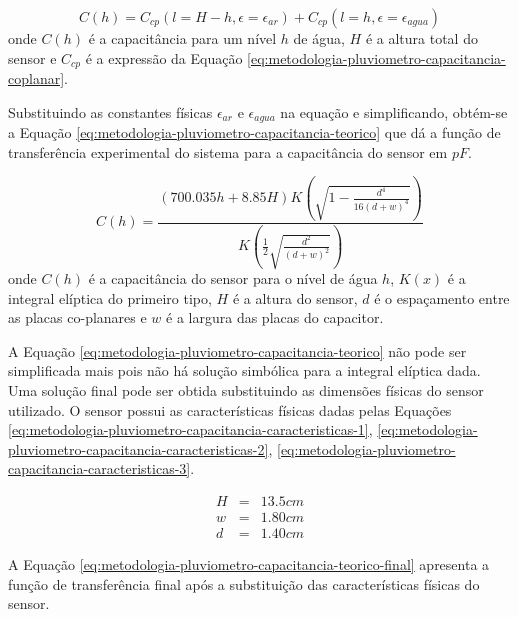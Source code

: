 \documentclass[a4paper]{instrumentacao}
\begin{document}
\begin{equation}
	C(h) = C_{cp}\left(l=H-h, \epsilon=\epsilon_{ar}\right) + C_{cp}\left(l=h, \epsilon=\epsilon_{agua}\right)
	\label{eq:metodologia-pluviometro-capacitancia-relacao}
\end{equation}
\noindent onde $C(h)$ é a capacitância para um nível $h$ de água, $H$ é a altura total do sensor e $C_{cp}$ é a expressão da Equação \ref{eq:metodologia-pluviometro-capacitancia-coplanar}.

Substituindo as constantes físicas $\epsilon_{ar}$ e $\epsilon_{agua}$ na equação e simplificando, obtém-se a Equação \ref{eq:metodologia-pluviometro-capacitancia-teorico} que dá a função de transferência experimental do sistema para a capacitância do sensor em $pF$.

\begin{equation}
	C(h) = \frac{(700.035 h+8.85 H) K\left(\sqrt{1-\frac{d^4}{16 (d+w)^4}}\right)}{K\left(\frac{1}{2} \sqrt{\frac{d^2}{(d+w)^2}}\right)}
	\label{eq:metodologia-pluviometro-capacitancia-teorico}
\end{equation}
\noindent onde $C(h)$ é a capacitância do sensor para o nível de água $h$, $K(x)$ é a integral elíptica do primeiro tipo, $H$ é a altura do sensor, $d$ é o espaçamento entre as placas co-planares e $w$ é a largura das placas do capacitor.

A Equação \ref{eq:metodologia-pluviometro-capacitancia-teorico} não pode ser simplificada mais pois não há solução simbólica para a integral elíptica dada. Uma solução final pode ser obtida substituindo as dimensões físicas do sensor utilizado. O sensor possui as características físicas dadas pelas Equações \ref{eq:metodologia-pluviometro-capacitancia-caracteristicas-1}, \ref{eq:metodologia-pluviometro-capacitancia-caracteristicas-2}, \ref{eq:metodologia-pluviometro-capacitancia-caracteristicas-3}.

\begin{eqnarray}
	H &=& 13.5cm \label{eq:metodologia-pluviometro-capacitancia-caracteristicas-1} \\
	w &=& 1.80cm \label{eq:metodologia-pluviometro-capacitancia-caracteristicas-2} \\
	d &=& 1.40cm \label{eq:metodologia-pluviometro-capacitancia-caracteristicas-3}
\end{eqnarray}

A Equação \ref{eq:metodologia-pluviometro-capacitancia-teorico-final} apresenta a função de transferência final após a substituição das características físicas do sensor.
\end{document}
